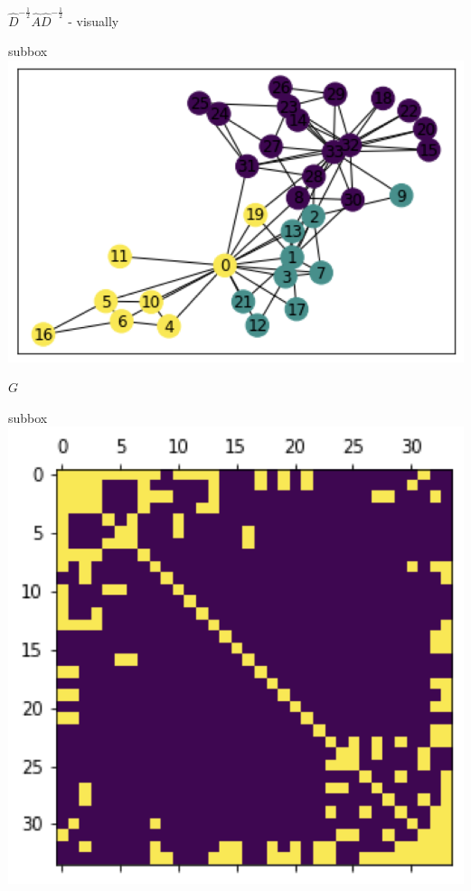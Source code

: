 \documentclass[a4paper,11pt]{book}
\begin{document}
\begin{textbox}{ $\hat{D}^{-\frac{1}{2}}\hat{A}\hat{D}^{-\frac{1}{2}}$ - visually}
\begin{multibox}{2}

\begin{subbox}{subbox}{}
\centering
\includegraphics[width=1\linewidth]{pics/Akarate.png}

$G$
\end{subbox}
\begin{subbox}{subbox}{}
\centering
\includegraphics[width=0.95\linewidth]{pics/A.png}


\end{subbox}
\end{multibox}
\end{textbox}
\end{document}
